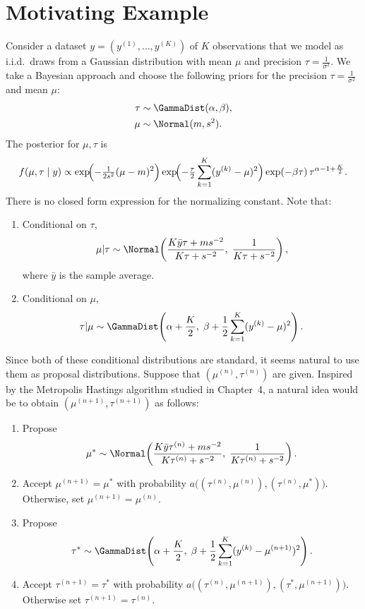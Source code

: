 
\section{Motivating Example}
\label{sec:5.1}

Consider a dataset $y = (y^{(1)}, \ldots, y^{(K)})$ of $K$ observations that we model as i.i.d.\
draws from a Gaussian distribution with mean $\mu$ and precision $\tau = \frac{1}{\sigma^2}$. We
take a Bayesian approach and choose the following priors for the precision $\tau = \frac{1}{\sigma^2}$
and mean $\mu$:
\begin{align*}
  \tau &\sim \GammaDist(\alpha, \beta),\\
  \mu  &\sim \Normal(m, s^2).
\end{align*}
The posterior for $\mu, \tau$ is
\[
  f(\mu, \tau \mid y)
  \propto
  \exp\!\Bigl(-\tfrac{1}{2s^2}(\mu - m)^2\Bigr)
  \exp\!\Bigl(-\tfrac{\tau}{2}\sum_{k=1}^{K}(y^{(k)} - \mu)^2\Bigr)
  \exp(-\beta\tau)\,\tau^{\alpha - 1 + \frac{K}{2}}.
\]
There is no closed form expression for the normalizing constant. Note that:
\begin{enumerate}
  \item Conditional on $\tau$,
    \[
      \mu|\tau \sim \Normal\!\left(\frac{K\bar{y}\tau + ms^{-2}}{K\tau + s^{-2}},\;
        \frac{1}{K\tau + s^{-2}}\right),
    \]
    where $\bar{y}$ is the sample average.

  \item Conditional on $\mu$,
    \[
      \tau|\mu \sim \GammaDist\!\left(\alpha + \frac{K}{2},\;
        \beta + \frac{1}{2}\sum_{k=1}^{K}(y^{(k)} - \mu)^2\right).
    \]
\end{enumerate}

Since both of these conditional distributions are standard, it seems natural to use them as
proposal distributions. Suppose that $(\mu^{(n)}, \tau^{(n)})$ are given. Inspired by the
Metropolis Hastings algorithm studied in Chapter~4, a natural idea would be to obtain
$(\mu^{(n+1)}, \tau^{(n+1)})$ as follows:
\begin{enumerate}
  \item Propose
    \[
      \mu^* \sim \Normal\!\left(\frac{K\bar{y}\tau^{(n)} + ms^{-2}}{K\tau^{(n)} + s^{-2}},\;
        \frac{1}{K\tau^{(n)} + s^{-2}}\right).
    \]

  \item Accept $\mu^{(n+1)} = \mu^*$ with probability
    $a\bigl((\tau^{(n)}, \mu^{(n)}),(\tau^{(n)}, \mu^*)\bigr)$.
    Otherwise, set $\mu^{(n+1)} = \mu^{(n)}$.

  \item Propose
    \[
      \tau^* \sim \GammaDist\!\left(\alpha + \frac{K}{2},\;
        \beta + \frac{1}{2}\sum_{k=1}^{K}(y^{(k)} - \mu^{(n+1)})^2\right).
    \]

  \item Accept $\tau^{(n+1)} = \tau^*$ with probability
    $a\bigl((\tau^{(n)}, \mu^{(n+1)}),(\tau^*, \mu^{(n+1)})\bigr)$.
    Otherwise set $\tau^{(n+1)} = \tau^{(n)}$.
\end{enumerate}

